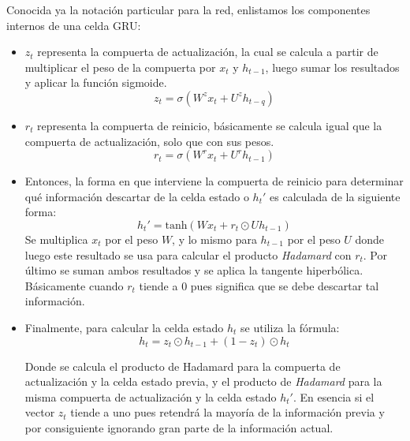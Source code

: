 \documentclass[12pt, letterpaper]{article}
\begin{document}
    Conocida ya la notación particular para la red, enlistamos los componentes internos de una celda GRU:  

    \begin{itemize}
        \item $z_t$ representa la compuerta de actualización, la cual se calcula a partir de multiplicar el peso de la compuerta por $x_t$ y $h_{t-1}$, luego sumar los resultados y aplicar la función sigmoide.
        \begin{equation}
            z_t=\sigma(W^zx_t+U^zh_{t-q})
        \end{equation}
        \item $r_t$ representa la compuerta de reinicio, básicamente se calcula igual que la compuerta de actualización, solo que con sus pesos.
        \begin{equation}
            r_t=\sigma(W^rx_t+U^rh_{t-1})
        \end{equation}
        \item Entonces, la forma en que interviene la compuerta de reinicio para determinar qué información descartar de la celda estado o $h_t'$ es calculada de la siguiente forma:
        \begin{equation}
            h_t'=\text{tanh}(Wx_t + r_t\odot{Uh_{t-1}})
        \end{equation}
        Se multiplica $x_t$ por el peso $W$, y lo mismo para $h_{t-1}$ por el peso $U$ donde luego este resultado se usa para calcular el producto \emph{Hadamard} con $r_t$. Por último se suman ambos resultados y se aplica la tangente hiperbólica. Básicamente cuando $r_t$ tiende a $0$ pues significa que se debe descartar tal información.

        \item Finalmente, para calcular la celda estado $h_t$ se utiliza la fórmula:
        \begin{equation}
            h_t = z_t\odot{h_{t-1} + (1-z_t)\odot{h_t}}
        \end{equation}
        
        Donde se calcula el producto de Hadamard para la compuerta de actualización y la celda estado previa, y el producto de \emph{Hadamard} para la misma compuerta de actualización y la celda estado $h_t'$. En esencia si el vector $z_t$ tiende a uno pues retendrá la mayoría de la información previa y por consiguiente ignorando gran parte de la información actual\cite{Kostadinov_2019}.
    \end{itemize}
\end{document}
